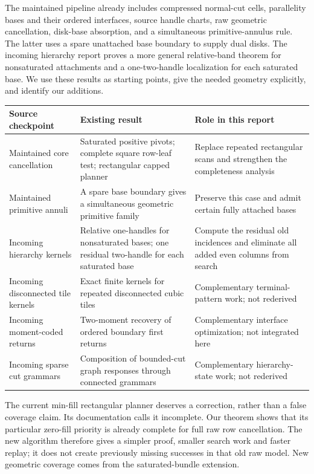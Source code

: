 The maintained pipeline already includes compressed normal-cut cells,
parallelity bases and their ordered interfaces, source handle charts,
raw geometric cancellation, disk-base absorption, and a simultaneous
primitive-annulus rule. The latter uses a spare unattached base boundary
to supply dual disks. The incoming hierarchy report proves a more general
relative-band theorem for nonsaturated attachments and a one-two-handle
localization for each saturated base. We use these results as starting
points, give the needed geometry explicitly, and identify our additions.

\begin{longtable}{@{}>{\raggedright\arraybackslash}p{}
>{\raggedright\arraybackslash}p{}
>{\raggedright\arraybackslash}p{}@{}}
\toprule
Source checkpoint & Existing result & Role in this report\\
\midrule\endhead
Maintained core cancellation & Saturated positive pivots; complete square
row-leaf test; rectangular capped planner & Replace repeated rectangular
scans and strengthen the completeness analysis\\
Maintained primitive annuli & A spare base boundary gives a simultaneous
geometric primitive family & Preserve this case and admit certain fully
attached bases\\
Incoming hierarchy kernels & Relative one-handles for nonsaturated bases;
one residual two-handle for each saturated base & Compute the residual old
incidences and eliminate all added even columns from search\\
Incoming disconnected tile kernels & Exact finite kernels for repeated
disconnected cubic tiles & Complementary terminal-pattern work; not rederived\\
Incoming moment-coded returns & Two-moment recovery of ordered boundary
first returns & Complementary interface optimization; not integrated here\\
Incoming sparse cut grammars & Composition of bounded-cut graph responses
through connected grammars & Complementary hierarchy-state work; not rederived\\
\bottomrule
\end{longtable}

The current min-fill rectangular planner deserves a correction, rather
than a false coverage claim. Its documentation calls it incomplete.
Our theorem shows that its particular zero-fill priority is already complete
for full raw row cancellation. The new algorithm therefore gives a simpler
proof, smaller search work and faster replay; it does not create previously
missing successes in that old raw model. New geometric coverage comes from
the saturated-bundle extension.

